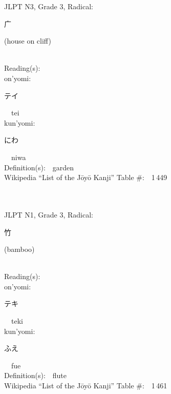 \begin{multicols}{2}
{JLPT N3, Grade 3, Radical:\ \ {\begin{CJK}{UTF8}{min} 广 \end{CJK}} (house on cliff) } \\
Reading(s):\ \ \\
{\hspace*{1em}}on'yomi:\ \ \\
{\hspace*{2em}}{\begin{CJK}{UTF8}{min} テイ \end{CJK}}\ \ tei\ \ \\
{\hspace*{1em}}kun'yomi:\ \ \\
{\hspace*{2em}}{\begin{CJK}{UTF8}{min} にわ \end{CJK}}\ \ niwa\ \ \\
Definition(s):\ \ garden \\
Wikipedia ``List of the J\=oy\=o Kanji'' Table \#:\ \ 1\,449 \\
\ \ \\
{\fontsize{34pt}{40pt}  }\ \ \\  %
{JLPT N1, Grade 3, Radical:\ \ {\begin{CJK}{UTF8}{min} 竹 \end{CJK}} (bamboo) } \\
Reading(s):\ \ \\
{\hspace*{1em}}on'yomi:\ \ \\
{\hspace*{2em}}{\begin{CJK}{UTF8}{min} テキ \end{CJK}}\ \ teki\ \ \\
{\hspace*{1em}}kun'yomi:\ \ \\
{\hspace*{2em}}{\begin{CJK}{UTF8}{min} ふえ \end{CJK}}\ \ fue\ \ \\
Definition(s):\ \ flute \\
Wikipedia ``List of the J\=oy\=o Kanji'' Table \#:\ \ 1\,461 \\
\ \ \\
{\fontsize{34pt}{40pt}  }\ \ \\  %

\end{multicols}
